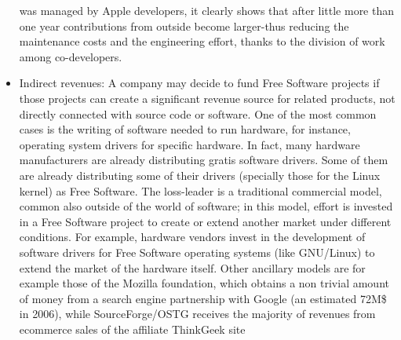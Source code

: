 \begin{itemize}
was managed by Apple developers, it clearly shows that after little more than
one year contributions from outside become larger-thus reducing the maintenance
costs and the engineering effort, thanks to the division of work among
co-developers.
 \item Indirect revenues: A company may decide to fund Free Software projects if
those projects can create a significant revenue source for related products, not
directly connected with source code or software. One of the most common cases is
the writing of software needed to run hardware, for instance, operating system
drivers for specific hardware. In fact, many hardware manufacturers are already
distributing gratis software drivers. Some of them are already distributing some
of their drivers (specially those for the Linux kernel) as Free Software.  The
loss-leader is a traditional commercial model, common also outside of the world
of software; in this model, effort is invested in a Free Software project to
create or extend another market under different conditions. For example,
hardware vendors invest in the development of software drivers for Free Software
operating systems (like GNU/Linux) to extend the market of the hardware itself.
Other ancillary models are  for example those of the Mozilla foundation, which
obtains a non trivial amount of money from a search engine partnership with
Google (an estimated 72M\$ in 2006), while SourceForge/OSTG receives the
majority of revenues from ecommerce sales of the affiliate ThinkGeek site
\end{itemize}

